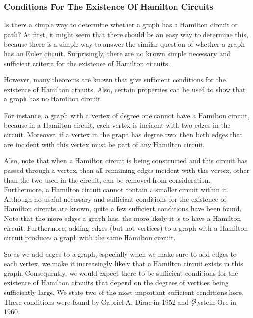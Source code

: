 \documentclass[11pt]{article}
\begin{document}
\subsubsection{Conditions For The Existence Of Hamilton Circuits}

Is there a simple way to determine whether a graph has a Hamilton circuit or path? At first, it might seem that there should be an easy way to determine this, because there is a simple way to answer the similar question of whether a graph has an Euler circuit. Surprisingly, there are no known simple necessary and sufficient criteria for the existence of Hamilton circuits.

However, many theorems are known that give sufficient conditions for the existence of Hamilton circuits. Also, certain properties can be used to show that a graph has no Hamilton circuit. 

For instance, a graph with a vertex of degree one cannot have a Hamilton circuit, because in a Hamilton circuit, each vertex is incident with two edges in the circuit. Moreover, if a vertex in the graph has degree two, then both edges that are incident with this vertex must be part of any Hamilton circuit. 

Also, note that when a Hamilton circuit is being constructed and this circuit has passed through a vertex, then all remaining edges incident with this vertex, other than the two used in the circuit, can be removed from consideration. Furthermore, a Hamilton circuit cannot contain a smaller circuit within it.\\


Although no useful necessary and sufficient conditions for the existence of Hamilton circuits are known, quite a few sufficient conditions have been found. Note that the more edges a graph has, the more likely it is to have a Hamilton circuit. Furthermore, adding edges (but not vertices) to a graph with a Hamilton circuit produces a graph with the same Hamilton circuit.

So as we add edges to a graph, especially when we make sure to add edges to each vertex, we make it increasingly likely that a Hamilton circuit exists in this graph. Consequently, we would expect there to be sufficient conditions for the existence of Hamilton circuits that depend on the degrees of vertices being sufficiently large. We state two of the most important sufficient conditions here. These conditions were found by Gabriel A. Dirac in 1952 and $\centernot{O}$ystein Ore in 1960.
\end{document}
